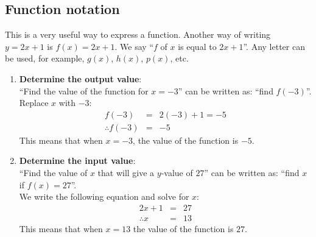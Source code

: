 \subsection*{Function notation}
This is a very useful way to express a function. Another way of
writing $y=2x+1$ is $f(x) = 2x+1$. We say ``$f$ of $x$ is equal to
$2x+1$''. Any letter can be used, for example, $g(x)$, $h(x)$, $p(x)$, etc. 
\begin{enumerate}[noitemsep, label=\textbf{\arabic*}. ] 
\item \textbf{Determine the output value}: \\
``Find the value of the function for $x=-3$'' can be written as: ``find $f(-3)$''.
\\Replace $x$ with $-3$:
\begin{eqnarray*}
  f(-3) & = & 2(-3)+1=-5 \\
  \therefore f(-3) & = & -5
\end{eqnarray*}
This means that when $x=-3$, the value of the function is $-5$.
\item \textbf{Determine the input value}:\\
 ``Find the value of $x$ that will give a $y$-value of $27$'' can be written as: ``find $x$ if $f(x)= 27$''. \\
We write the following equation and solve for $x$:
\begin{eqnarray*}
  2x+1 &=& 27 \\
  \therefore x &=& 13
\end{eqnarray*}
This means that when $x=13$ the value of the function is $27$.

\end{enumerate}

